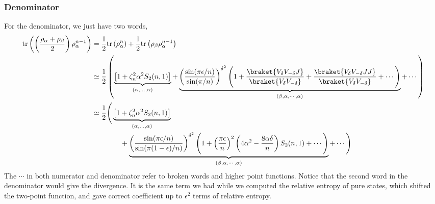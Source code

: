 \documentclass[11pt]{article}
\newcommand{\ep}{\epsilon}
\newcommand{\nn}{\nonumber}
\newcommand{\lb}{\left(}
\newcommand{\rb}{\right)}
\begin{document}
\subsubsection{Denominator}
For the denominator, we just have two words,
\begin{align}
    \text{tr}\lb \lb \frac{\rho_\alpha + \rho_\beta}{2}\rb \rho_\alpha^{n-1} \rb &= \frac{1}{2}\text{tr}\lb\rho_\alpha^n\rb + \frac{1}{2}\text{tr}\lb\rho_\beta \rho_\alpha^{n-1}\rb \\
    &\simeq  \frac{1}{2}\lb \underbrace{
    \left[1+\zeta_n^2\alpha^2 S_2(n,1)\right]
}_{(\alpha,\ldots,\alpha)}
+ \underbrace{\lb\frac{\sin(\pi\ep/n)}{\sin(\pi/n)}\rb^{\delta^2}\Bigg( 1 + \frac{\braket{V_\delta  V_{-\delta}J}}{\braket{V_\delta V_{-\delta}}}+ \frac{\braket{V_\delta  V_{-\delta}JJ}}{\braket{V_\delta V_{-\delta}}}+\cdots\Bigg)}_{(\beta,\alpha,\cdots,\alpha)} + \cdots \rb \\
&\simeq  \frac{1}{2}\Bigg( \underbrace{
    \left[1+\zeta_n^2\alpha^2 S_2(n,1)\right]
}_{(\alpha,\ldots,\alpha)}
\nn\\
&\qquad \qquad + \underbrace{\lb\frac{\sin(\pi\ep/n)}{\sin(\pi(1-\ep)/n)}\rb^{\delta^2}\Bigg( 1 + \lb\frac{\pi\ep}{n}\rb^2 \lb4\alpha^2 - \frac{8\alpha \delta}{n}\rb S_2(n,1)+ \cdots 
\Bigg)
}_{(\beta,\alpha,\cdots,\alpha)} + \cdots 
\Bigg)
\end{align}
The $\cdots$ in both numerator and denominator refer to broken words and higher point functions.
Notice that the second word in the denominator would give the divergence. It is the same term we had while we computed the relative entropy of pure states, which shifted the two-point function, and gave correct coefficient up to $\ep^2$ terms of relative entropy. 
\end{document}
